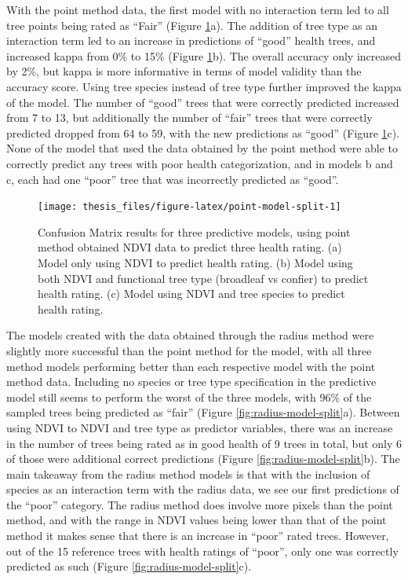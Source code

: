 \documentclass[12pt,twoside]{reedthesis}
\begin{document}
With the point method data, the first model with no interaction term led to all tree points being rated as ``Fair'' (Figure \ref{fig:point-model-split}a). The addition of tree type as an interaction term led to an increase in predictions of ``good'' health trees, and increased kappa from 0\% to 15\% (Figure \ref{fig:point-model-split}b). The overall accuracy only increased by 2\%, but kappa is more informative in terms of model validity than the accuracy score. Using tree species instead of tree type further improved the kappa of the model. The number of ``good'' trees that were correctly predicted increased from 7 to 13, but additionally the number of ``fair'' trees that were correctly predicted dropped from 64 to 59, with the new predictions as ``good'' (Figure \ref{fig:point-model-split}c). None of the model that used the data obtained by the point method were able to correctly predict any trees with poor health categorization, and in models b and c, each had one ``poor'' tree that was incorrectly predicted as ``good''.
\begin{figure}
\texttt{[image: thesis\_files/figure-latex/point-model-split-1]} \caption[Confusion matrixes for Point method predictive models]{Confusion Matrix results for three predictive models, using point method obtained NDVI data to predict three health rating. (a) Model only using NDVI to predict health rating. (b) Model using both NDVI and functional tree type (broadleaf vs confier) to predict health rating. (c) Model using NDVI and tree species to predict health rating.}\label{fig:point-model-split}
\end{figure}
The models created with the data obtained through the radius method were slightly more successful than the point method for the model, with all three method models performing better than each respective model with the point method data. Including no species or tree type specification in the predictive model still seems to perform the worst of the three models, with 96\% of the sampled trees being predicted as ``fair'' (Figure \ref{fig:radius-model-split}a). Between using NDVI to NDVI and tree type as predictor variables, there was an increase in the number of trees being rated as in good health of 9 trees in total, but only 6 of those were additional correct predictions (Figure \ref{fig:radius-model-split}b). The main takeaway from the radius method models is that with the inclusion of species as an interaction term with the radius data, we see our first predictions of the ``poor'' category. The radius method does involve more pixels than the point method, and with the range in NDVI values being lower than that of the point method it makes sense that there is an increase in ``poor'' rated trees. However, out of the 15 reference trees with health ratings of ``poor'', only one was correctly predicted as such (Figure \ref{fig:radius-model-split}c).
\end{document}
